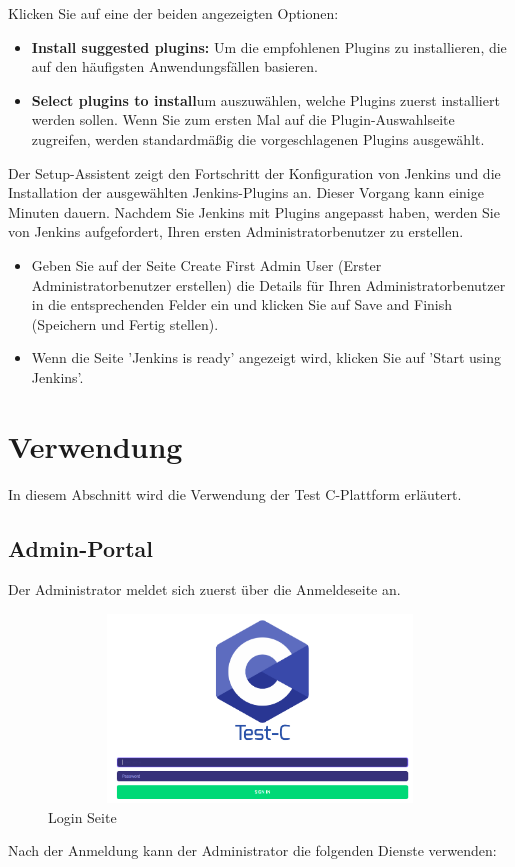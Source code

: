 \documentclass[a4paper,12pt,oneside]{book}
\begin{document}
Klicken Sie auf eine der beiden angezeigten Optionen:
\begin{itemize}
	\item \textbf{Install suggested plugins: } Um die empfohlenen Plugins zu installieren, die auf den häufigsten Anwendungsfällen basieren.
	\item \textbf{Select plugins to install}um auszuwählen, welche Plugins zuerst installiert werden sollen. Wenn Sie zum ersten Mal auf die Plugin-Auswahlseite zugreifen, werden standardmäßig die vorgeschlagenen Plugins ausgewählt.
\end{itemize}
Der Setup-Assistent zeigt den Fortschritt der Konfiguration von Jenkins und die Installation der ausgewählten Jenkins-Plugins an. Dieser Vorgang kann einige Minuten dauern.
\newline
Nachdem Sie Jenkins mit Plugins angepasst haben, werden Sie von Jenkins aufgefordert, Ihren ersten Administratorbenutzer zu erstellen.
\begin{itemize}
	\item Geben Sie auf der Seite Create First Admin User (Erster Administratorbenutzer erstellen) die Details für Ihren Administratorbenutzer in die entsprechenden Felder ein und klicken Sie auf Save and Finish (Speichern und Fertig stellen).
	\item Wenn die Seite 'Jenkins is ready' angezeigt wird, klicken Sie auf 'Start using Jenkins'.
\end{itemize}

\section{Verwendung}
In diesem Abschnitt wird die Verwendung der Test C-Plattform erläutert.
\subsection{Admin-Portal}
Der Administrator meldet sich zuerst über die Anmeldeseite an.
\begin{figure}[h!]
	\begin{center}
		\includegraphics[width=14cm, height=5cm]{AdminLogin.PNG}
		\caption{Login Seite} 
		\label{Login Seite} 
	\end{center}
\end{figure}
\newline
Nach der Anmeldung kann der Administrator die folgenden Dienste verwenden:
\end{document}

